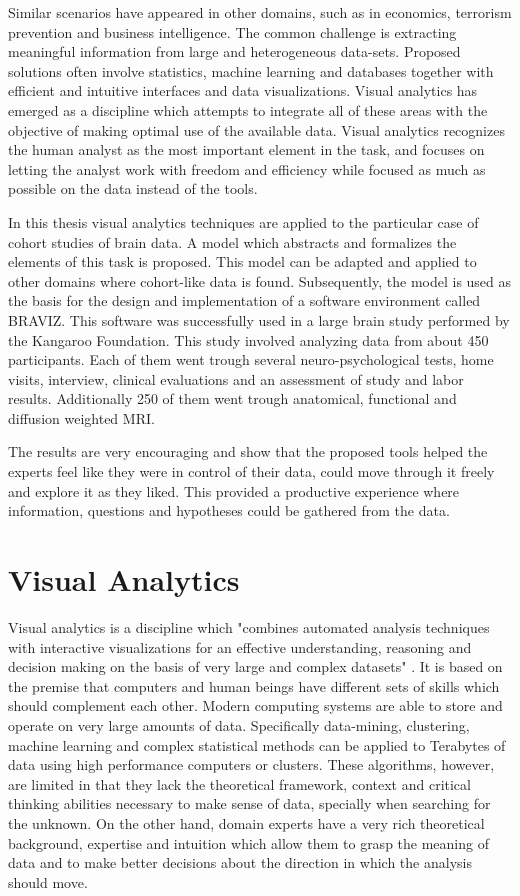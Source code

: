 Similar scenarios have appeared in other domains, such as in economics, terrorism prevention and business intelligence. The common challenge is extracting meaningful information from large and heterogeneous data-sets. Proposed solutions often involve statistics, machine learning and databases together with efficient and intuitive interfaces and data visualizations. Visual analytics has emerged as a discipline which attempts to integrate all of these areas with the objective of making optimal use of the available data. Visual analytics recognizes the human analyst as the most important element in the task, and focuses on letting the analyst work with freedom and efficiency while focused as much as possible on the data instead of the tools.

In this thesis visual analytics techniques are applied to the particular case of cohort studies of brain data. A model which abstracts and formalizes the elements of this task is proposed. This model can be adapted and applied to other domains where cohort-like data is found. Subsequently, the model is used as the basis for the design and implementation of a software environment called BRAVIZ. This software was successfully used in a large brain study performed by the Kangaroo Foundation. This study involved analyzing data from about 450 participants. Each of them went trough several neuro-psychological tests, home visits, interview, clinical evaluations and an assessment of study and labor results. Additionally 250 of them went trough anatomical, functional and diffusion weighted MRI.

The results are very encouraging and show that the proposed tools  helped the experts feel like they were in control of their data, could move through it freely and explore it as they liked. This provided a productive experience where information, questions and hypotheses could be gathered from the data.


\section{Visual Analytics}


Visual analytics is a discipline which "combines automated analysis techniques with interactive
visualizations for an effective understanding, reasoning and decision making on the basis of very
large and complex datasets" \autocite{cook_illuminating_2005}. It is based on the premise that computers and
human beings have different sets of skills which should complement each other. Modern
computing systems are able to store and operate on very large amounts of data.
Specifically data-mining, clustering, machine learning and complex statistical methods can be
applied to Terabytes of data using high performance computers or clusters. These
algorithms, however, are limited in that they lack the theoretical framework, context and critical
thinking abilities necessary to make sense of data, specially when searching for the unknown. 
On the other hand, domain experts have a very rich theoretical
background, expertise and intuition which allow them to grasp the meaning of data and to
make better decisions about the direction in which the analysis should move. 

